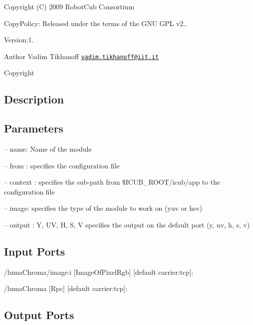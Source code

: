 Copyright (C) 2009 Robot\+Cub Consortium

Copy\+Policy\+: Released under the terms of the G\+NU G\+PL v2..

Version\+:1. \begin{DoxyAuthor}{Author}
Vadim Tikhanoff \href{mailto:vadim.tikhanoff@iit.it}{\tt vadim.\+tikhanoff@iit.\+it} ~\newline
 
\end{DoxyAuthor}
\begin{DoxyCopyright}{Copyright}

\end{DoxyCopyright}
\hypertarget{group__seg2cloud_intro_sec}{}\subsection{Description}\label{group__seg2cloud_intro_sec}
\hypertarget{group__seg2cloud_parameters_sec}{}\subsection{Parameters}\label{group__seg2cloud_parameters_sec}

\begin{DoxyItemize}
\item -- name\+: Name of the module
\item -- from \+: specifies the configuration file
\item -- context \+: specifies the sub-\/path from {\ttfamily \$\+I\+C\+U\+B\+\_\+\+R\+O\+OT/icub/app} to the configuration file
\item -- image\+: specifies the type of the module to work on (yuv or hsv)
\item -- output \+: Y, UV, H, S, V specifies the output on the default port (y, uv, h, s, v) 
\end{DoxyItemize}\hypertarget{group__seg2cloud_inputports_sec}{}\subsection{Input Ports}\label{group__seg2cloud_inputports_sec}

\begin{DoxyItemize}
\item /luma\+Chroma/image\+:i \mbox{[}Image\+Of\+Pixel\+Rgb\mbox{]} \mbox{[}default carrier\+:tcp\mbox{]}\+:
\item /luma\+Chroma \mbox{[}Rpc\mbox{]} \mbox{[}default carrier\+:tcp\mbox{]}\+:
\end{DoxyItemize}\hypertarget{group__seg2cloud_outputports_sec}{}\subsection{Output Ports}\label{group__seg2cloud_outputports_sec}

